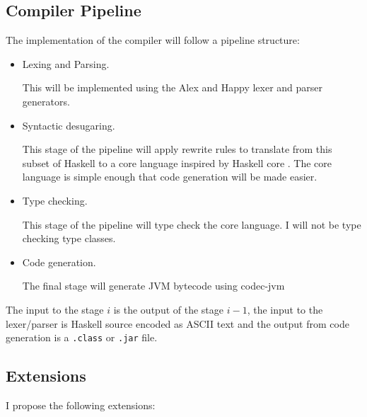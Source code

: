 \documentclass[12pt,a4paper,twoside]{article}
\begin{document}
  \subsection*{Compiler Pipeline}
  The implementation of the compiler will follow a pipeline structure:

  \begin{itemize}
    \item Lexing and Parsing.

      This will be implemented using the Alex and Happy lexer and parser generators.
    \item Syntactic desugaring.

      This stage of the pipeline will apply rewrite rules to translate from this subset of Haskell to a core language inspired by Haskell core \cite{typedcorelink}.
      The core language is simple enough that code generation will be made easier.
    \item Type checking.

     This stage of the pipeline will type check the core language. I will not be type checking type classes.
    \item Code generation.

     The final stage will generate JVM bytecode using codec-jvm \cite{codec-jvm-link}
  \end{itemize}

  The input to the stage $i$ is the output of the stage $i-1$, the input to the lexer/parser is Haskell source encoded as ASCII text and the
  output from code generation is a \texttt{.class} or \texttt{.jar} file.

  \subsection*{Extensions}

  I propose the following extensions:
\end{document}
